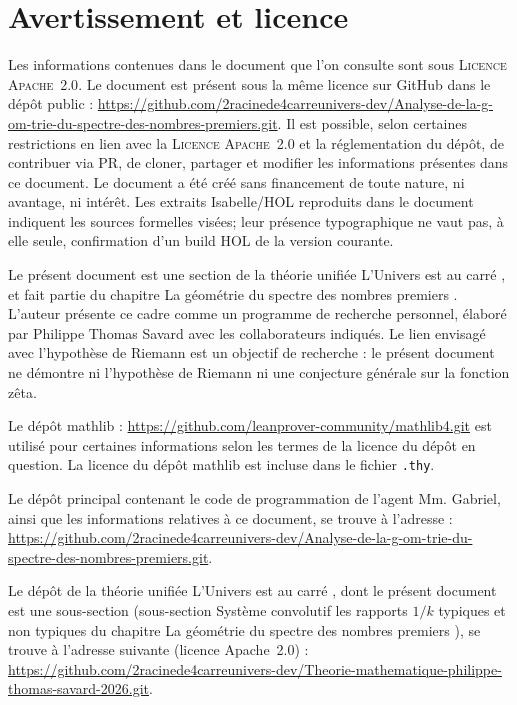 \documentclass[11pt,a4paper]{article}
\begin{document}
\section*{Avertissement et licence}

Les informations contenues dans le document que l'on consulte sont sous
\textsc{Licence Apache~2.0}. Le document est présent sous la même licence sur
GitHub dans le dépôt public :
\url{https://github.com/2racinede4carreunivers-dev/Analyse-de-la-g-om-trie-du-spectre-des-nombres-premiers.git}.
Il est possible, selon certaines restrictions en lien avec la \textsc{Licence
Apache~2.0} et la réglementation du dépôt, de contribuer via PR, de cloner,
partager et modifier les informations présentes dans ce document. Le document a été créé sans financement de toute nature, ni
avantage, ni intérêt. Les extraits Isabelle/HOL reproduits dans le document
indiquent les sources formelles visées; leur présence typographique ne vaut
pas, à elle seule, confirmation d'un build HOL de la version courante.

Le présent document est une section de la théorie unifiée \og L'Univers est au
carré \fg{}, et fait partie du chapitre \og La géométrie du spectre des nombres
premiers \fg{}. L'auteur présente ce cadre comme un programme de recherche
personnel, élaboré par Philippe Thomas Savard avec les collaborateurs indiqués.
Le lien envisagé avec l'hypothèse de Riemann est un objectif de recherche :
le présent document ne démontre ni l'hypothèse de Riemann ni une conjecture
générale sur la fonction zêta.

Le dépôt mathlib : \url{https://github.com/leanprover-community/mathlib4.git}
est utilisé pour certaines informations selon les termes de la licence du dépôt
en question. La licence du dépôt mathlib est incluse dans le fichier \texttt{.thy}.

Le dépôt principal contenant le code de programmation de l'agent Mm. Gabriel,
ainsi que les informations relatives à ce document, se trouve à l'adresse :
\url{https://github.com/2racinede4carreunivers-dev/Analyse-de-la-g-om-trie-du-spectre-des-nombres-premiers.git}.

Le dépôt de la théorie unifiée \og L'Univers est au carré \fg{}, dont le présent
document est une sous-section (sous-section \og Système convolutif les rapports
$1/k$ typiques et non typiques \fg{} du chapitre \og La géométrie du spectre des
nombres premiers \fg{}), se trouve à l'adresse suivante (licence Apache~2.0) :
\url{https://github.com/2racinede4carreunivers-dev/Theorie-mathematique-philippe-thomas-savard-2026.git}.
\end{document}

